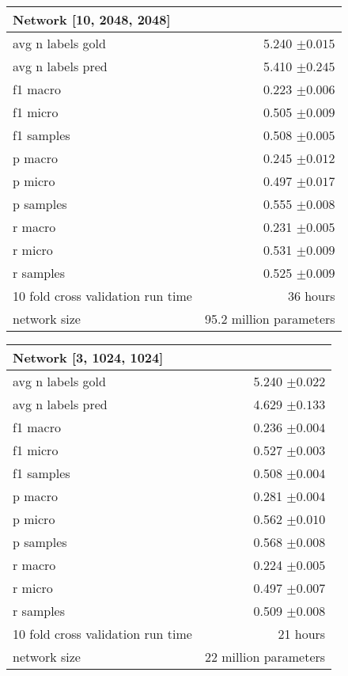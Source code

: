 \documentclass{article}
\begin{document}
\begin{table} [H]
 \centering
  \begin{tabular}{l | r}
   \textbf{Network [10, 2048, 2048]} &  \\
   \hline
   \hline
   avg n labels gold & 5.240 $\pm 0.015$ \\
   \hline
   avg n labels pred & 5.410 $\pm 0.245$ \\
   \hline
   f1 macro & 0.223 $\pm 0.006$ \\
   \hline
   f1 micro & 0.505 $\pm 0.009$ \\
   \hline
   f1 samples & 0.508 $\pm 0.005$ \\
   \hline
   p macro & 0.245 $\pm 0.012$ \\
   \hline
   p micro & 0.497 $\pm 0.017$ \\
   \hline
   p samples & 0.555 $\pm 0.008$ \\
   \hline
   r macro & 0.231 $\pm 0.005$ \\
   \hline
   r micro & 0.531 $\pm 0.009$ \\
   \hline
   r samples & 0.525 $\pm 0.009$ \\
   \hline
   10 fold cross validation run time & 36 hours \\
   \hline
   network size & 95.2 million parameters \\
  \end{tabular}

  \begin{tabular}{l | r}
   \textbf{Network [3, 1024, 1024]} &  \\
   \hline
   \hline
   avg n labels gold & 5.240 $\pm 0.022$ \\
   \hline
   avg n labels pred & 4.629 $\pm 0.133$ \\
   \hline
   f1 macro & 0.236 $\pm 0.004$ \\
   \hline
   f1 micro &  0.527 $\pm 0.003$ \\
   \hline
   f1 samples & 0.508 $\pm  0.004$ \\
   \hline
   p macro & 0.281 $\pm 0.004$ \\
   \hline
   p micro & 0.562 $\pm 0.010$ \\
   \hline
   p samples &  0.568 $\pm 0.008$ \\
   \hline
   r macro & 0.224 $\pm 0.005$ \\
   \hline
   r micro & 0.497 $\pm 0.007$ \\
   \hline
   r samples & 0.509 $\pm 0.008$ \\
   \hline
   10 fold cross validation run time & 21 hours \\
   \hline
   network size & 22 million parameters \\
  \end{tabular}


\end{table}
\end{document}
